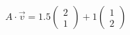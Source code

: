 \documentclass[preview]{standalone}
\begin{document}
\begin{align*}
A \cdot \vec{v} = 1.5 \begin{pmatrix} 2 \\ 1 \end{pmatrix} + 1 \begin{pmatrix} 1 \\ 2 \end{pmatrix}
\end{align*}
\end{document}
